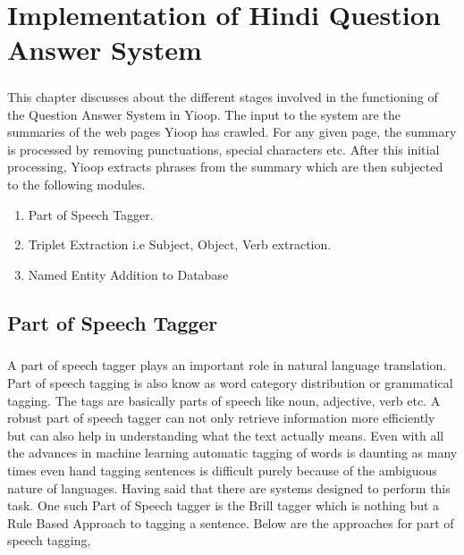 \chapter{Implementation of Hindi Question Answer System}

\paragraph{}
This chapter discusses about the different stages involved in the functioning of the  Question Answer System in Yioop. The input to the system are the summaries of the web pages Yioop has crawled. For any given page, the summary is processed  by removing punctuations, special characters etc. After this initial processing, Yioop extracts phrases from the summary which are then subjected to the following modules.

\begin{enumerate} 
\item Part of Speech Tagger.
\item Triplet Extraction i.e Subject, Object, Verb extraction.
\item Named Entity Addition to Database
\end{enumerate}

\section{Part of Speech Tagger}
\paragraph{}
A part of speech tagger plays an important role in natural language translation. Part of speech tagging is also know as word category distribution or grammatical tagging. The tags are basically parts of speech like noun, adjective, verb etc.   A robust part of speech tagger  can not only retrieve information more efficiently but can also help in understanding what the text actually means. Even with all the advances in machine learning automatic tagging of words  is daunting as many times even hand tagging sentences is difficult purely because of the ambiguous nature of languages. Having said that there are systems designed to perform this task. One such Part of Speech tagger is the Brill tagger which is nothing but a Rule Based Approach to tagging a sentence. Below are the approaches for part of speech tagging, 

